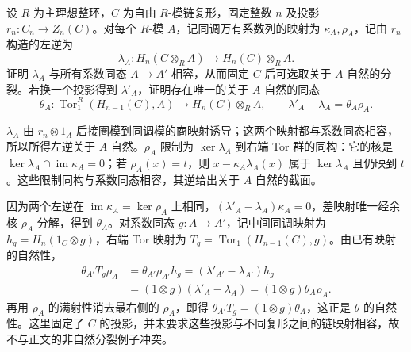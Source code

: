 \begin{exercise}\label{b4:ex:09-uct-splitting-coefficients}
	设 \(R\) 为主理想整环，\(C\) 为自由 \(R\)-模链复形，固定整数 \(n\) 及投影 \(r_n:C_n\to Z_n(C)\)。对每个 \(R\)-模 \(A\)，记同调万有系数列的映射为 \(\kappa_A,\rho_A\)，记由 \(r_n\) 构造的左逆为
	\[
		\lambda_A:H_n(C\otimes_R A)\longrightarrow H_n(C)\otimes_R A.
	\]
	证明 \(\lambda_A\) 与所有系数同态 \(A\to A'\) 相容，从而固定 \(C\) 后可选取关于 \(A\) 自然的分裂。若换一个投影得到 \(\lambda'_A\)，证明存在唯一的关于 \(A\) 自然的同态
	\[
		\theta_A:\operatorname{Tor}_1^R(H_{n-1}(C),A) \longrightarrow H_n(C)\otimes_R A, \qquad \lambda'_A-\lambda_A=\theta_A\rho_A.
	\]
\end{exercise}
\begin{solution}
	\(\lambda_A\) 由 \(r_n\otimes1_A\) 后接圈模到同调模的商映射诱导；这两个映射都与系数同态相容，所以所得左逆关于 \(A\) 自然。\(\rho_A\) 限制为 \(\ker\lambda_A\) 到右端 Tor 群的同构：它的核是 \(\ker\lambda_A\cap\operatorname{im}\kappa_A=0\)；若 \(\rho_A(x)=t\)，则 \(x-\kappa_A\lambda_A(x)\) 属于 \(\ker\lambda_A\) 且仍映到 \(t\)。这些限制同构与系数同态相容，其逆给出关于 \(A\) 自然的截面。

	因为两个左逆在 \(\operatorname{im}\kappa_A=\ker\rho_A\) 上相同，\((\lambda'_A-\lambda_A)\kappa_A=0\)，差映射唯一经余核 \(\rho_A\) 分解，得到 \(\theta_A\)。对系数同态 \(g:A\to A'\)，记中间同调映射为 \(h_g=H_n(1_C\otimes g)\)，右端 Tor 映射为 \(T_g=\operatorname{Tor}_1(H_{n-1}(C),g)\)。由已有映射的自然性，
	\[
		\begin{aligned}
			\theta_{A'}T_g\rho_A &=\theta_{A'}\rho_{A'}h_g =(\lambda'_{A'}-\lambda_{A'})h_g\\
			&=(1\otimes g)(\lambda'_A-\lambda_A) =(1\otimes g)\theta_A\rho_A.
		\end{aligned}
	\]
	再用 \(\rho_A\) 的满射性消去最右侧的 \(\rho_A\)，即得 \(\theta_{A'}T_g=(1\otimes g)\theta_A\)，这正是 \(\theta\) 的自然性。这里固定了 \(C\) 的投影，并未要求这些投影与不同复形之间的链映射相容，故不与正文的非自然分裂例子冲突。
\end{solution}
